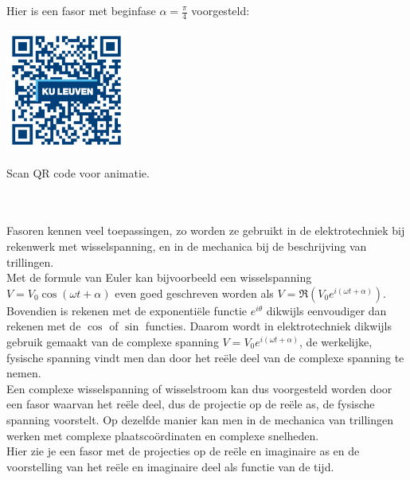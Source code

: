 Hier is een fasor met beginfase $\alpha=\frac{\pi}{4}$ voorgesteld:\\

\begin{minipage}{.25\linewidth}
	\raggedright
	\includegraphics[width=4cm]{3_gonio_complexe_getallen/inputs/QR_Code_ANIMATIE5_module3new}
\end{minipage}
\begin{minipage}{.7\linewidth}
	Scan QR code voor animatie.
\end{minipage}    \\   \\

Fasoren kennen veel toepassingen, zo worden ze gebruikt in de elektrotechniek bij rekenwerk met wisselspanning, en in de mechanica bij de beschrijving van trillingen. \\ 
Met de formule van Euler kan bijvoorbeeld een wisselspanning $V=V_{0}\cos(\omega t + \alpha)$ even goed geschreven worden als $V=\Re (V_{0}e^{i(\omega t + \alpha)}) $. Bovendien is rekenen met de exponenti\"{e}le functie $e^{i\theta}$ dikwijls eenvoudiger dan rekenen met de $\cos$ of $\sin$ functies. Daarom wordt in elektrotechniek dikwijls gebruik gemaakt van de complexe spanning $V=V_{0}e^{i(\omega t + \alpha)}$, de werkelijke, fysische spanning vindt men dan door het re\"{e}le deel van de complexe spanning te nemen.\\
Een complexe wisselspanning of wisselstroom kan dus voorgesteld worden door een fasor waarvan het re\"{e}le deel, dus de projectie op de re\"{e}le as, de fysische spanning voorstelt.  Op dezelfde manier kan men in de mechanica van trillingen werken met complexe plaatsco\"{o}rdinaten en complexe snelheden.\\

Hier zie je een fasor met de projecties op de re\"{e}le en imaginaire as en de voorstelling van het re\"{e}le en imaginaire deel als functie van de tijd. \\


